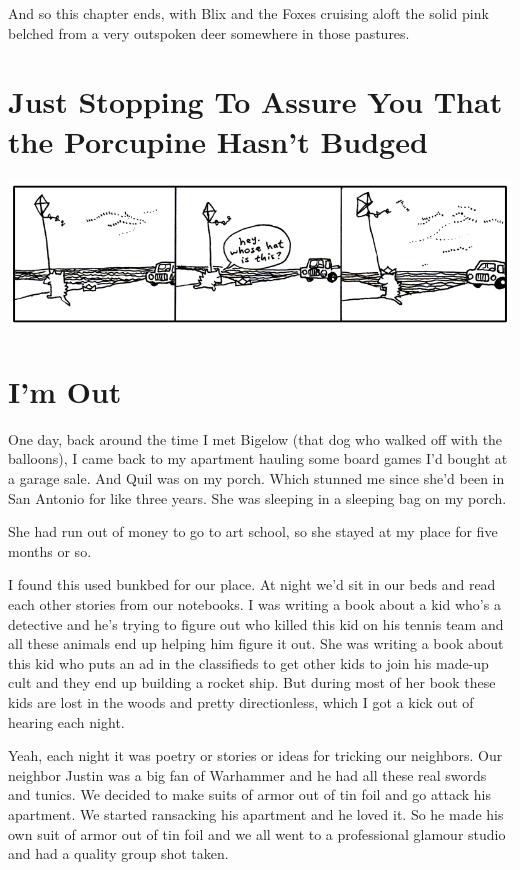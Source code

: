 \documentclass[10pt,twoside]{report}
\begin{document}
And so this chapter ends, with Blix and the Foxes cruising aloft the
solid pink belched from a very outspoken deer somewhere in those
pastures.

\newpage


\section{Just Stopping To Assure You That the Porcupine Hasn't Budged}


	\includegraphics[width=1.0\textwidth]{cache/76.png}


\section{I'm Out}



One day, back around the time I met Bigelow (that dog who walked off
with the balloons), I came back to my apartment hauling some board
games I'd bought at a garage sale.  And Quil was on my porch.  Which
stunned me since she'd been in San Antonio for like three years.  She
was sleeping in a sleeping bag on my porch.

She had run out of money to go to art school, so she stayed at my
place for five months or so.

I found this used bunkbed for our place.  At night we'd sit in our
beds and read each other stories from our notebooks.  I was writing a
book about a kid who's a detective and he's trying to figure out who
killed this kid on his tennis team and all these animals end up
helping him figure it out.  She was writing a book about this kid who
puts an ad in the classifieds to get other kids to join his made-up
cult and they end up building a rocket ship.  But during most of her
book these kids are lost in the woods and pretty directionless, which
I got a kick out of hearing each night.

Yeah, each night it was poetry or stories or ideas for tricking our
neighbors.  Our neighbor Justin was a big fan of Warhammer and he had
all these real swords and tunics.  We decided to make suits of armor
out of tin foil and go attack his apartment.  We started ransacking
his apartment and he loved it.  So he made his own suit of armor out
of tin foil and we all went to a professional glamour studio and had a
quality group shot taken.
\end{document}
